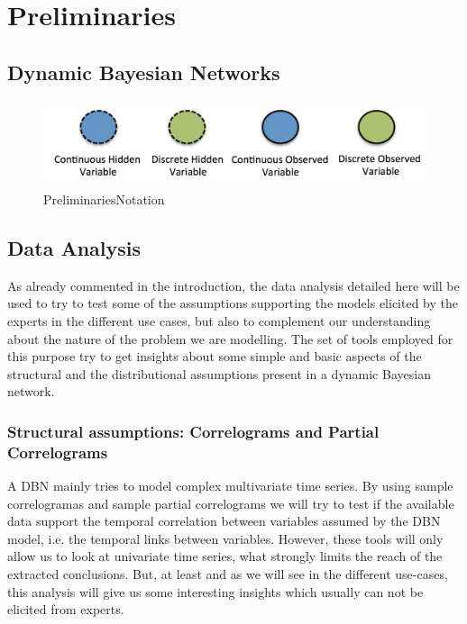 \section{Preliminaries}\label{Section:Preliminaries}

\subsection{Dynamic Bayesian Networks}



\begin{figure}
\begin{center}
\includegraphics[scale=0.4]{./figures/PreliminariesNotation}
\caption{\label{Figure:PreliminariesNotation}PreliminariesNotation
}
\end{center}
\end{figure}





\subsection{Data Analysis}

As already commented in the introduction, the data analysis detailed here will be used to try to test some of the assumptions supporting the models elicited by the experts in the different use cases, but also to complement our understanding about the nature of the problem we are modelling. The set of tools employed for this purpose try to get insights about some simple and basic aspects of the structural and the distributional assumptions present in a dynamic Bayesian network.


\subsubsection*{Structural assumptions:  Correlograms and Partial Correlograms}

A DBN mainly tries to model complex multivariate time series. By using sample correlogramas and sample partial correlograms we will try to test if the available data support the temporal correlation between variables assumed by the DBN model, i.e. the temporal links between variables. However, these tools will only allow us to look at univariate time series, what strongly limits the reach of the  extracted conclusions. But, at least and as we will see in the different use-cases, this analysis will give us some interesting insights which usually can not be elicited from experts.  


